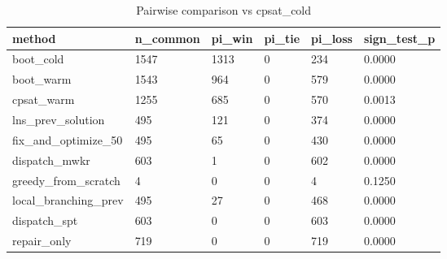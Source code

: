 \begin{table}[t]
\centering
\begin{tabular}{llllll}
\toprule
method & n\_common & pi\_win & pi\_tie & pi\_loss & sign\_test\_p \\
\midrule
boot\_cold & 1547 & 1313 & 0 & 234 & 0.0000 \\
boot\_warm & 1543 & 964 & 0 & 579 & 0.0000 \\
cpsat\_warm & 1255 & 685 & 0 & 570 & 0.0013 \\
lns\_prev\_solution & 495 & 121 & 0 & 374 & 0.0000 \\
fix\_and\_optimize\_50 & 495 & 65 & 0 & 430 & 0.0000 \\
dispatch\_mwkr & 603 & 1 & 0 & 602 & 0.0000 \\
greedy\_from\_scratch & 4 & 0 & 0 & 4 & 0.1250 \\
local\_branching\_prev & 495 & 27 & 0 & 468 & 0.0000 \\
dispatch\_spt & 603 & 0 & 0 & 603 & 0.0000 \\
repair\_only & 719 & 0 & 0 & 719 & 0.0000 \\
\bottomrule
\end{tabular}
\caption{Pairwise comparison vs cpsat_cold}
\label{tab:ablation}
\end{table}
